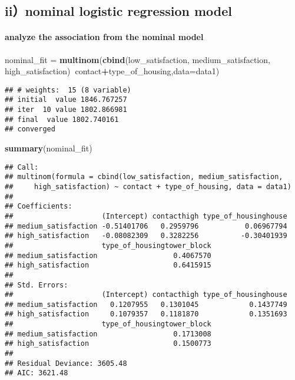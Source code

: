 \documentclass[]{article}
\newenvironment{Shaded}{\begin{snugshade}}{\end{snugshade}}
\newcommand{\KeywordTok}[1]{\textcolor[rgb]{0.13,0.29,0.53}{\textbf{#1}}}
\newcommand{\DataTypeTok}[1]{\textcolor[rgb]{0.13,0.29,0.53}{#1}}
\newcommand{\StringTok}[1]{\textcolor[rgb]{0.31,0.60,0.02}{#1}}
\newcommand{\OperatorTok}[1]{\textcolor[rgb]{0.81,0.36,0.00}{\textbf{#1}}}
\newcommand{\NormalTok}[1]{#1}
\let\oldparagraph\paragraph
\renewcommand{\paragraph}[1]{\oldparagraph{#1}\mbox{}}
\begin{document}
\subsection{ii）nominal logistic regression
model}\label{iinominal-logistic-regression-model}

\paragraph{analyze the association from the nominal
model}\label{analyze-the-association-from-the-nominal-model}

\begin{Shaded}
\begin{Highlighting}[]
\NormalTok{nominal_fit =}\StringTok{ }\KeywordTok{multinom}\NormalTok{(}\KeywordTok{cbind}\NormalTok{(low_satisfaction, medium_satisfaction, high_satisfaction)}\OperatorTok{~}\NormalTok{contact}\OperatorTok{+}\NormalTok{type_of_housing,}\DataTypeTok{data=}\NormalTok{data1)}
\end{Highlighting}
\end{Shaded}

\begin{verbatim}
## # weights:  15 (8 variable)
## initial  value 1846.767257 
## iter  10 value 1802.866981
## final  value 1802.740161 
## converged
\end{verbatim}

\begin{Shaded}
\begin{Highlighting}[]
\KeywordTok{summary}\NormalTok{(nominal_fit)}
\end{Highlighting}
\end{Shaded}

\begin{verbatim}
## Call:
## multinom(formula = cbind(low_satisfaction, medium_satisfaction, 
##     high_satisfaction) ~ contact + type_of_housing, data = data1)
## 
## Coefficients:
##                     (Intercept) contacthigh type_of_housinghouse
## medium_satisfaction -0.51401706   0.2959796           0.06967794
## high_satisfaction   -0.08082309   0.3282256          -0.30401939
##                     type_of_housingtower_block
## medium_satisfaction                  0.4067570
## high_satisfaction                    0.6415915
## 
## Std. Errors:
##                     (Intercept) contacthigh type_of_housinghouse
## medium_satisfaction   0.1207955   0.1301045            0.1437749
## high_satisfaction     0.1079357   0.1181870            0.1351693
##                     type_of_housingtower_block
## medium_satisfaction                  0.1713008
## high_satisfaction                    0.1500773
## 
## Residual Deviance: 3605.48 
## AIC: 3621.48
\end{verbatim}
\end{document}
